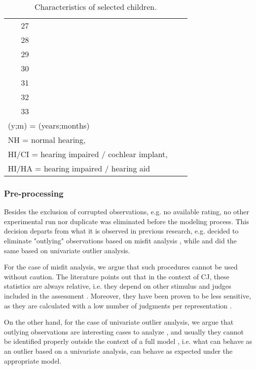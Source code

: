 \begin{table}[h!]
\begin{tabular}{|| c | cccccccc || }
		27 &  &  &  &  &  &  &  &\\
		\rowcolor{gray}
		28 &  &  &  &  &  &  &  &\\
		29 &  &  &  &  &  &  &  &\\
		\rowcolor{gray}
		30 &  &  &  &  &  &  &  &\\
		31 &  &  &  &  &  &  &  &\\ 
		\rowcolor{gray}
		32 &  &  &  &  &  &  &  &\\ 
		33 &  &  &  &  &  &  &  &\\
		\hline
		\multicolumn{7}{l}{\footnotesize{(y;m) = (years;months)}} \\
		\multicolumn{7}{l}{\footnotesize{NH = normal hearing,}} \\
		\multicolumn{7}{l}{\footnotesize{HI/CI = hearing impaired / cochlear implant,}} \\
		\multicolumn{7}{l}{\footnotesize{HI/HA = hearing impaired / hearing aid}}
	\end{tabular}
	\caption{Characteristics of selected children.}
	\label{tab:children_char}
\end{table}
%
%
\subsubsection{Pre-processing} \label{ss_sect:preproc}
%
Besides the exclusion of corrupted observations, e.g. no available rating, no other experimental run nor duplicate was eliminated before the modeling process. This decision departs from what it is observed in previous research, e.g. \citet{Boonen_et_al_2020} decided to eliminate "outlying" observations based on misfit analysis \citep{Lesterhuis_2018}, while \citet{vanDaal_2020} and \citet{Boonen_et_al_2021} did the same based on univariate outlier analysis. 

For the case of misfit analysis, we argue that such procedures cannot be used without caution. The literature points out that in the context of CJ, these statistics are always relative, i.e. they depend on other stimulus and judges included in the assessment \citep{Pollitt_2012a, Pollitt_2012b}. Moreover, they have been proven to be less sensitive, as they are calculated with a low number of judgments per representation \citep{Pollitt_2012a}. 

On the other hand, for the case of univariate outlier analysis, we argue that outlying observations are interesting cases to analyze \citep{McElreath_2020}, and usually they cannot be identified properly outside the context of a full model \citep{McElreath_2020}, i.e. what can behave as an outlier based on a univariate analysis, can behave as expected under the appropriate model. 

